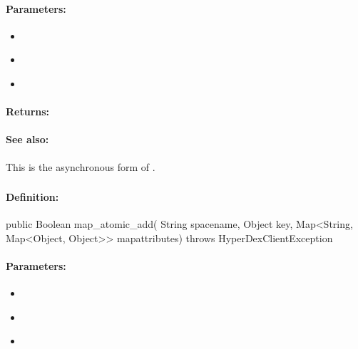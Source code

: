 \paragraph{Parameters:}
\begin{itemize}[noitemsep]
\item {}\\

\item {}\\

\item {}\\

\end{itemize}

\paragraph{Returns:}


\paragraph{See also:}  This is the asynchronous form of .

\pagebreak
\subsubsection{}
\label{api:java:map_atomic_add}


\paragraph{Definition:}
\begin{javacode}
public Boolean map_atomic_add(
        String spacename,
        Object key,
        Map<String, Map<Object, Object>> mapattributes) throws HyperDexClientException
\end{javacode}

\paragraph{Parameters:}
\begin{itemize}[noitemsep]
\item {}\\

\item {}\\

\item {}\\

\end{itemize}

